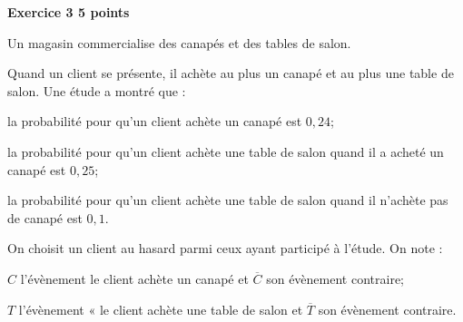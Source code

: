 \textbf{\large Exercice 3 \hfill 5 points}

\bigskip

Un magasin commercialise des canapés et des tables de salon.

Quand un client se présente, il achète au plus un canapé et au plus une table de salon. Une étude a montré que :

\begin{list}{\textbullet}{}
\item la probabilité pour qu'un client achète un canapé est $0,24$;
\item la probabilité pour qu'un client achète une table de salon quand il a acheté un canapé est $0,25$;
\item la probabilité pour qu'un client achète une table de salon quand il n'achète pas de canapé est $0,1$.
\end{list}

On choisit un client au hasard parmi ceux ayant participé à l'étude. On note :

\begin{list}{\textbullet}{}
\item $C$ l'évènement \og le client achète un canapé \fg{} et $\overline{C}$ son évènement contraire;
\item $T$ l'évènement « le client achète une table de salon \fg{} et $\overline{T}$ son évènement contraire.
\end{list}

